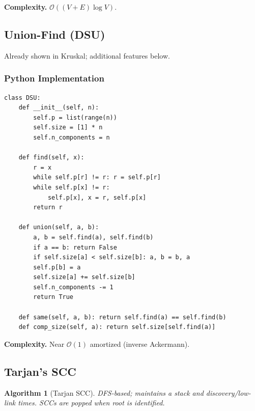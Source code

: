 \documentclass[10pt,a4paper]{article}
\theoremstyle{cpstyle}
\newtheorem{algorithm}[theorem]{Algorithm}
\newcommand{\bigO}[1]{\mathcal{O}\!\left(#1\right)}
\begin{document}
\textbf{Complexity.} $\bigO{(V+E)\log V}$.

\subsection{Union-Find (DSU)}

Already shown in Kruskal; additional features below.

\subsubsection{Python Implementation}
\begin{lstlisting}[caption={DSU with size tracking and rollback}]
class DSU:
    def __init__(self, n):
        self.p = list(range(n))
        self.size = [1] * n
        self.n_components = n

    def find(self, x):
        r = x
        while self.p[r] != r: r = self.p[r]
        while self.p[x] != r:
            self.p[x], x = r, self.p[x]
        return r

    def union(self, a, b):
        a, b = self.find(a), self.find(b)
        if a == b: return False
        if self.size[a] < self.size[b]: a, b = b, a
        self.p[b] = a
        self.size[a] += self.size[b]
        self.n_components -= 1
        return True

    def same(self, a, b): return self.find(a) == self.find(b)
    def comp_size(self, a): return self.size[self.find(a)]
\end{lstlisting}

\textbf{Complexity.} Near $\bigO{1}$ amortized (inverse Ackermann).

\subsection{Tarjan's SCC}

\begin{algorithm}[Tarjan SCC]
DFS-based; maintains a stack and discovery/low-link times. SCCs are popped when root is identified.
\end{algorithm}
\end{document}

